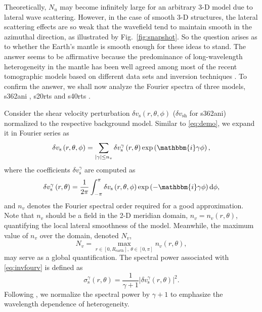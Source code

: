 \documentclass[extra]{gji}
\begin{document}
Theoretically, $N_u$ may become infinitely large for an arbitrary 3-D model 
due to lateral wave scattering. However, in the case of smooth 3-D structures, 
the lateral scattering effects are so weak that  
the wavefield tend to maintain smooth in the azimuthal direction, as
illustrated by Fig.~\ref{fig:snapshot}. 
So the question arises as to whether the Earth's mantle is 
smooth enough for these ideas to stand. 
The answer seems to be affirmative because
the predominance of long-wavelength heterogeneity in the mantle 
\cite[]{su1991predominance} has been well agreed among
most of the recent tomographic models based on different data 
sets and inversion techniques \cite[]{becker2002comparison}.
To confirm the answer, we shall now analyze the Fourier spectra of 
three models, s362ani \cite[]{kustowski2008s362ani}, 
s20rts \cite[]{ritsema1999s20rts} and 
s40rts \cite[]{ritsema2011s40rts}.

Consider the shear velocity perturbation $\delta v_{\text{s}}\left(r,\theta,\phi\right)$ 
($\delta v_{\text{sh}}$ for s362ani) normalized to the respective background model.  
Similar to \eqref{eq:demo}, we expand it in Fourier series as
\begin{equation}
  \delta v_{\text{s}}\left(r,\theta,\phi\right)=\sum_{|\gamma| \le n_v} 
  \delta v_{\text{s}}^\gamma\left(r,\theta\right)\exp\left(\mathbbm{i}\gamma\phi\right),
  \label{eq:fourv}
\end{equation}
where the coefficients $\delta v_{\text{s}}^\gamma$ are computed as
\begin{equation}
  \delta v_{\text{s}}^\gamma\left(r,\theta\right) = \frac{1}{2\pi}\int_{-\pi}^{\pi}
  \delta v_{\text{s}}\left(r,\theta,\phi\right)\exp\left(-\mathbbm{i}\gamma\phi\right)
  \text{d}\phi,
  \label{eq:invfourv}
\end{equation}
and $n_v$ denotes the Fourier spectral order required for a good approximation. 
Note that $n_v$ should be a field in the 2-D meridian domain, 
$n_v=n_v\left(r,\theta\right)$,
quantifying the local lateral smoothness of the model. 
Meanwhile, the maximum value of $n_v$ over the domain, denoted $N_v$, 
\begin{equation}
  N_v=\max_{r\in[0,R_{\text{earth}}],\ \theta\in[0,\pi]}n_v\left(r,\theta\right),
\end{equation} 
may serve as a global quantification. 
The spectral power associated with \eqref{eq:invfourv} is defined as
\begin{equation}
  \sigma_{\text{s}}^\gamma\left(r,\theta\right)=\frac{1}{\gamma+1} 
  \left|\delta v_{\text{s}}^\gamma\left(r,\theta\right) \right|^2.
  \label{eq:spow}
\end{equation}
Following \cite{becker2002comparison}, we normalize the spectral power by 
$\gamma+1$ to emphasize the wavelength dependence of heterogeneity. 
\end{document}
